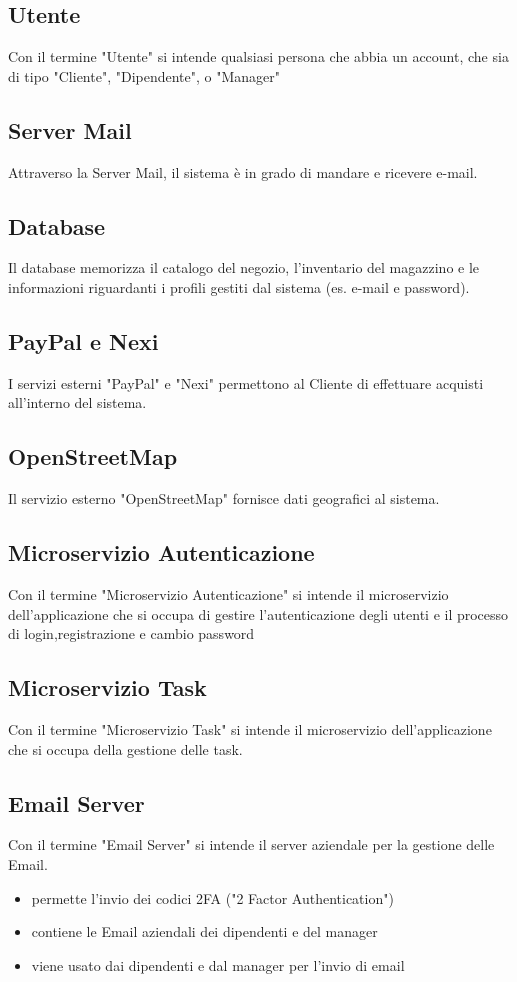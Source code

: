 \documentclass{report}
\begin{document}
\subsection*{Utente}
Con il termine "Utente" si intende qualsiasi persona che abbia un account, che sia di tipo "Cliente", "Dipendente", o "Manager"
\subsection*{Server Mail}
Attraverso la Server Mail, il sistema è in grado di mandare e ricevere e-mail. 

\subsection*{Database}
Il database memorizza il catalogo del negozio, l'inventario del magazzino e le informazioni riguardanti i profili gestiti dal sistema (es. e-mail e password).

\subsection*{PayPal e Nexi}
I servizi esterni "PayPal" e "Nexi" permettono al Cliente di effettuare acquisti all'interno del sistema.

\subsection*{OpenStreetMap}
Il servizio esterno "OpenStreetMap" fornisce dati geografici al sistema.%

\subsection*{Microservizio Autenticazione}
Con il termine "Microservizio Autenticazione" si intende il microservizio dell'applicazione che si occupa di gestire l'autenticazione degli utenti e il processo di login,registrazione e cambio password
\subsection*{Microservizio Task}
Con il termine "Microservizio Task" si intende il microservizio dell'applicazione che si occupa della gestione delle task.
\subsection*{Email Server}
Con il termine "Email Server" si intende il server aziendale per la gestione delle Email.
\begin{itemize}
	\item permette l'invio dei codici 2FA ("2 Factor Authentication")
	\item contiene le Email aziendali dei dipendenti e del manager
	\item viene usato dai dipendenti e dal manager per l'invio di email 
\end{itemize}
\end{document}
